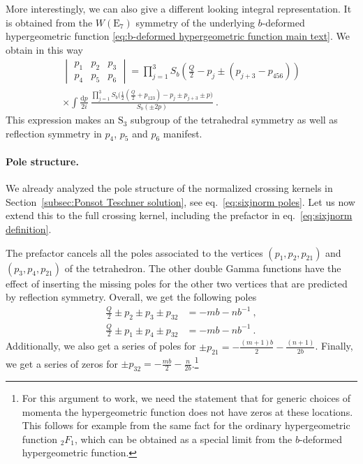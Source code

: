 \documentclass[12pt,a4paper]{article}
\newcommand{\sixjnorm}[6]{\begin{vmatrix}
#1 & #2 & #3 \\
#4 & #5 & #6
\end{vmatrix}
}
\begin{document}
More interestingly, we can also give a different looking integral representation. It is obtained from the $W(\mathrm{E}_7)$ symmetry of the underlying $b$-deformed hypergeometric function \eqref{eq:b-deformed hypergeometric function main text}. We obtain in this way
\begin{multline}
    \sixjnorm{p_1}{p_2}{p_3}{p_4}{p_5}{p_6}=\prod_{j=1}^3S_b(\tfrac{Q}{2}-p_j \pm (p_{j+3}-p_{456}))\\
    \times \int \frac{\mathrm{d}p}{2i}\ \frac{\prod_{j=1}^3 S_b\big(\frac{1}{2}(\frac{Q}{2}+p_{123})-p_j \pm p_{j+3} \pm p\big)}{S_b( \pm 2p)} \ . \label{eq:alternative integral representation of the normalized crossing kernel}
\end{multline}
This expression makes an $\mathrm{S}_3$ subgroup of the tetrahedral symmetry as well as reflection symmetry in $p_4$, $p_5$ and $p_6$ manifest.



\paragraph{Pole structure.}
We already analyzed the pole structure of the normalized crossing kernels in Section~\ref{subsec:Ponsot Teschner solution}, see eq.~\eqref{eq:sixjnorm poles}. Let us now extend this to the full crossing kernel, including the prefactor in eq.~\eqref{eq:sixjnorm definition}. 

The prefactor cancels all the poles associated to the vertices $(p_1,p_2,p_{21})$ and $(p_3,p_4,p_{21})$ of the tetrahedron. The other double Gamma functions have the effect of inserting the missing poles for the other two vertices that are predicted by reflection symmetry. Overall, we get the following poles
\begin{subequations}
\begin{align}
    \frac{Q}{2} \pm p_2\pm p_3\pm p_{32}&=-m b-n b^{-1}\ , \\
    \frac{Q}{2} \pm p_1\pm p_4\pm p_{32}&=-m b-n b^{-1}\ .
\end{align}
\end{subequations}
Additionally, we also get a series of poles for $\pm p_{21}=-\frac{(m+1) b}{2}-\frac{(n+1) }{2b}$. Finally, we get a series of zeros for $\pm p_{32}=-\frac{m b}{2}-\frac{n }{2b}$.\footnote{For this argument to work, we need the statement that for generic choices of momenta the hypergeometric function does not have zeros at these locations. This follows for example from the same fact for the ordinary hypergeometric function ${}_2F_1$, which can be obtained as a special limit from the $b$-deformed hypergeometric function.}
\end{document}
